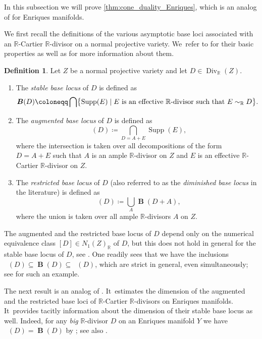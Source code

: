 \documentclass[JEP,XML,SOM,Unicode,published]{cedram}
\theoremstyle{plain}
\theoremstyle{definition}
\newtheorem{dfn}[thm]{Definition}
\newcommand{\R}{\mathbb{R}}
\DeclareMathOperator{\Supp}{Supp}
\DeclareMathOperator{\Div}{Div}
\DeclareMathOperator{\sbs}{\boldsymbol{B}}
\DeclareMathOperator{\dbs}{\boldsymbol{B}_{--}}
\DeclareMathOperator{\abs}{\boldsymbol{B}_{+}}
\begin{document}
In this subsection we will prove \autoref{thm:cone_duality_Enriques}, which is an analog of \cite[Th.\,B]{DRO25} for Enriques manifolds.

We first recall the definitions of the various asymptotic base loci associated with an $\R$-Cartier $\R$\nobreakdash-divisor on a normal projective variety. We~refer to \cite{Nak04book,ELMNP06,BBP13,TX25} for their basic properties as well as for more information about them.

\begin{dfn}
\label{dfn:asymptoticbaseloci}
Let $Z$ be a normal projective variety and let $D \in \Div_{\R}(Z)$.
\begin{enumerate}
\item
The \emph{stable base locus} of $D$ is defined as
\[
\sbs(D) \coloneqq \bigcap \bigl\{ \Supp(E) \mid E \text{ is an effective $\R$\nobreakdash-divisor such that $E \sim_\R D$} \bigr\}.
\]

\item
The \emph{augmented base locus} of $D$ is defined as
\[
\abs(D) \coloneqq \bigcap_{D=A+E} \Supp(E),
\]
where the intersection is taken over all decompositions of the form $D=A+E$ such that $A$ is an ample $\R$\nobreakdash-divisor on $Z$ and $E$ is an effective $\R$-Cartier $\R$\nobreakdash-divisor on $Z$.

\item
The \emph{restricted base locus} of $D$ (also referred to as the \emph{diminished base locus} in the literature) is defined as
\[
\dbs(D) \coloneqq \bigcup_{A} \sbs(D+A),
\]
where the union is taken over all ample $\R$\nobreakdash-divisors $A$ on $Z$.
\end{enumerate}
\end{dfn}

The augmented and the restricted base locus of $D$ depend only on the numerical equivalence class $[D] \in N_1(Z)_\R$ of $D$, but this does not hold in general for the stable base locus of $D$, see \cite[Ex.\,1.1]{ELMNP06}. One readily sees that we have the inclusions
$\dbs(D) \subseteq \sbs(D) \subseteq \abs(D)$,
which are strict in general, even simultaneously; see \cite[Ex.\,3.4]{TX25} for such an example.

The next result is an analog of \cite[Th.\,A(1)]{DRO25}. It~estimates the dimension of the augmented and the restricted base loci of $\R$-Cartier $\R$\nobreakdash-divisors on Enriques manifolds. It~provides tacitly information about the dimension of their stable base locus as well. Indeed, for any \emph{big} $\R$\nobreakdash-divisor $D$ on an Enriques manifold $Y$ we have $\dbs(D) = \sbs(D)$ by \cite[Cor.\,A]{BBP13}; see also \cite[Cor.\,B(ii)]{TX25}.
\end{document}
